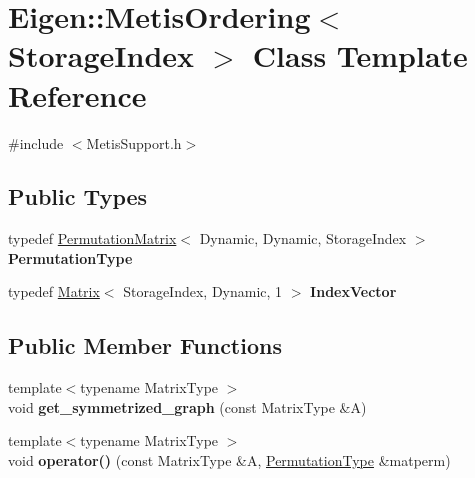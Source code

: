 \hypertarget{class_eigen_1_1_metis_ordering}{}\section{Eigen\+::Metis\+Ordering$<$ Storage\+Index $>$ Class Template Reference}
\label{class_eigen_1_1_metis_ordering}


{\ttfamily \#include $<$Metis\+Support.\+h$>$}

\subsection*{Public Types}
\begin{DoxyCompactItemize}
\item 
\mbox{\label{class_eigen_1_1_metis_ordering_a23b6007ffa970edf2557c84279e22ce5}} 
typedef \mbox{\hyperlink{class_eigen_1_1_permutation_matrix}{Permutation\+Matrix}}$<$ Dynamic, Dynamic, Storage\+Index $>$ {\bfseries Permutation\+Type}
\item 
\mbox{\label{class_eigen_1_1_metis_ordering_af043ef38d59d1ff5a0fff6c297fbebcd}} 
typedef \mbox{\hyperlink{class_eigen_1_1_matrix}{Matrix}}$<$ Storage\+Index, Dynamic, 1 $>$ {\bfseries Index\+Vector}
\end{DoxyCompactItemize}
\subsection*{Public Member Functions}
\begin{DoxyCompactItemize}
\item 
\mbox{\label{class_eigen_1_1_metis_ordering_ab3919cd70a1bfe70df6b6fc822e9b42b}} 
{\footnotesize template$<$typename Matrix\+Type $>$ }\\void {\bfseries get\+\_\+symmetrized\+\_\+graph} (const Matrix\+Type \&A)
\item 
\mbox{\label{class_eigen_1_1_metis_ordering_a48e1dc18153e426849b8f20c3a03a9c6}} 
{\footnotesize template$<$typename Matrix\+Type $>$ }\\void {\bfseries operator()} (const Matrix\+Type \&A, \mbox{\hyperlink{class_eigen_1_1_permutation_matrix}{Permutation\+Type}} \&matperm)
\end{DoxyCompactItemize}
